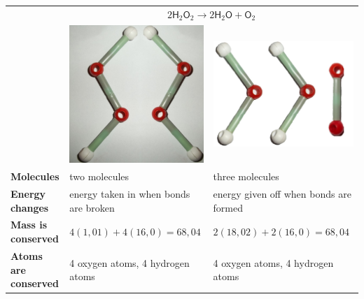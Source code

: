 \par
\begin{table}[H]
 \begin{center}
  \begin{tabular}{|l|l|l|} \hline
& \multicolumn{2}{|c|}{$2\mathsf{H}_{2}\mathsf{O}_{2} \rightarrow 2\mathsf{H}_{2}\mathsf{O} + \mathsf{O}_{2}$} \\ 
& \includegraphics[width=.1\textwidth]{photos/H2O2_models.png} & \includegraphics[width=.1\textwidth]{photos/H2O_O2.png} \\ \hline
   \textbf{Molecules} & two molecules & three molecules \\ \hline
\textbf{Energy changes} & energy taken in when bonds are broken & energy given off when bonds are formed \\ \hline
\textbf{Mass is conserved} & $4(1,01) + 4(16,0) = 68,04$ & $2(18,02) + 2(16,0) = 68,04$ \\ \hline
\textbf{Atoms are conserved} & 4 oxygen atoms, 4 hydrogen atoms & 4 oxygen atoms, 4 hydrogen atoms \\ \hline
  \end{tabular}
 \end{center}
\end{table}

